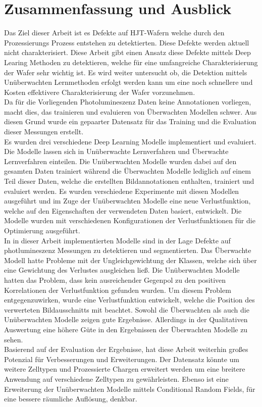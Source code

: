 \chapter{Zusammenfassung und Ausblick}

Das Ziel dieser Arbeit ist es Defekte auf HJT-Wafern welche durch den Prozessierungs Prozess entstehen zu detektierten. Diese Defekte werden aktuell nicht charakterisiert. Diese Arbeit gibt einen Ansatz diese Defekte mittels Deep Learing Methoden zu detektieren, welche für eine umfangreiche Charakterisierung der Wafer sehr wichtig ist. Es wird weiter untersucht ob, die Detektion mittels Unüberwachten Lernmethoden erfolgt werden kann um eine noch schnellere und Kosten effektivere Charakterisierung der Wafer vorzunehmen. \\

Da für die Vorliegenden Photolumineszenz Daten keine Annotationen vorliegen, macht dies, das trainieren und evaluieren von Überwachten Modellen schwer. Aus diesen Grund wurde ein gepaarter Datensatz für das Training und die Evaluation dieser Messungen erstellt.\\

Es wurden drei verschiedene Deep Learning Modelle implementiert und evaluiert. Die Modelle lassen sich in Unüberwachte Lernverfahren und Überwachte Lernverfahren einteilen. Die Unüberwachten Modelle wurden dabei auf den gesamten Daten trainiert während die Überwachten Modelle lediglich auf einem Teil dieser Daten, welche die erstellten Bildannotationen enthalten, trainiert und evaluiert werden. Es wurden verschiedene Experimente mit diesen Modellen ausgeführt und im Zuge der Unüberwachten Modelle eine neue Verlustfunktion, welche auf den Eigenschaften der verwendeten Daten basiert, entwickelt. Die Modelle wurden mit verschiedenen Konfigurationen der Verlustfunktionen für die Optimierung ausgeführt.\\

In in dieser Arbeit implementierten Modelle sind in der Lage Defekte auf photlumineszenz Messungen zu detektieren und segmentierten. Das Überwachte Modell hatte Probleme mit der Ungleichgewichtung der Klassen, welche sich  über eine Gewichtung des Verlustes ausgleichen ließ. Die Unüberwachten Modelle hatten das Problem, dass kein ausreichender Gegenpol zu den positiven Korrelationen der Verlustfunktion gefunden wurden. Um diesem Problem entgegenzuwirken, wurde eine Verlustfunktion entwickelt, welche die Position des verwerteten Bildausschnitts mit beachtet. Sowohl die Überwachten als auch die Unüberwachten Modelle zeigen gute Ergebnisse. Allerdings in der Qualitativen Auswertung eine höhere Güte in den Ergebnissen der Überwachten Modelle zu sehen. \\

Basierend auf der Evaluation der Ergebnisse, hat diese Arbeit weiterhin großes Potenzial für Verbesserungen und Erweiterungen. Der Datensatz könnte um weitere Zelltypen und Prozessierte Chargen erweitert werden um eine breitere Anwendung auf verschiedene Zelltypen zu gewährleisten. Ebenso ist eine Erweiterung der Unüberwachten Modelle mittels Conditional Random Fields, für eine bessere räumliche Auflösung, denkbar. 